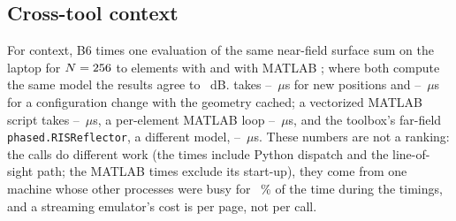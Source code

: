 \subsection{Cross-tool context}
For context, B6 times one evaluation of the same near-field surface sum
on the laptop for $N=256$ to \numBsixNmax{} elements with \sremu{} and with MATLAB
\txtBsixMatlab{}; where both compute the same model the results agree to
\numBsixAgreeDb~dB. \sremu{} takes \numBsixFullMinUs--\numBsixFullMaxUs~$\mu$s for new
positions and \numBsixCombMinUs--\numBsixCombMaxUs~$\mu$s for a configuration change with the
geometry cached; a vectorized MATLAB script takes \numBsixVecMinUs--\numBsixVecMaxUs~$\mu$s, a
per-element MATLAB loop \numBsixLoopMinUs--\numBsixLoopMaxUs~$\mu$s, and the toolbox's
far-field \texttt{phased.RISReflector}, a different model,
\numBsixRisrMinUs--\numBsixRisrMaxUs~$\mu$s. These numbers are not a ranking: the calls do
different work (the \sremu{} times include Python dispatch and the line-of-sight path; the
MATLAB times exclude its start-up), they come from one machine whose other processes were busy
for \numBsixBusyPct~\% of the time during the \sremu{} timings, and a streaming emulator's cost
is per page, not per call.

